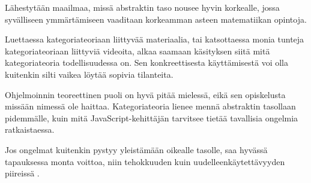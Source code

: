 





Lähestytään maailmaa, missä abstraktin taso nousee hyvin korkealle, jossa syvälliseen ymmärtämiseen vaaditaan korkeamman asteen matematiikan opintoja.

Luettaessa kategoriateoriaan liittyvää materiaalia, tai katsottaessa monia tunteja kategoriateoriaan liittyviä videoita, alkaa saamaan käsityksen siitä mitä kategoriateoria todellisuudessa on. Sen konkreettisesta käyttämisestä voi olla kuitenkin silti vaikea löytää sopivia tilanteita.

Ohjelmoinnin teoreettinen puoli on hyvä pitää mielessä, eikä sen opiskelusta missään nimessä ole haittaa. Kategoriateoria lienee mennä abstraktin tasollaan pidemmälle, kuin mitä JavaScript-kehittäjän tarvitsee tietää tavallisia ongelmia ratkaistaessa.

Jos ongelmat kuitenkin pystyy yleistämään oikealle tasolle, saa hyvässä tapauksessa monta voittoa, niin tehokkuuden kuin uudelleenkäytettävyyden piireissä \cite{clojure_compiler,bartosz_category_for_progamers}.


